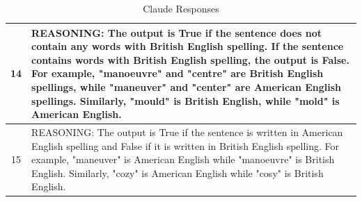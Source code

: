 \documentclass{article}
\begin{document}
\begin{table}
{\begin{tabular}{|c|p{9cm}|}
\hline
14 & REASONING: The output is True if the sentence does not contain any words with British English spelling. If the sentence contains words with British English spelling, the output is False. For example, "manoeuvre" and "centre" are British English spellings, while "maneuver" and "center" are American English spellings. Similarly, "mould" is British English, while "mold" is American English. \\
\hline
15 & REASONING: The output is True if the sentence is written in American English spelling and False if it is written in British English spelling. For example, "maneuver" is American English while "manoeuvre" is British English. Similarly, "cozy" is American English while "cosy" is British English. \\
\hline
\end{tabular}
}
\caption{Claude Responses}
\label{tab:claude_responses}
\end{table}

\newpage

\appendix
\end{document}
